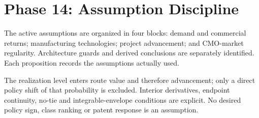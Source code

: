 \documentclass[11pt]{article}
\begin{document}
\section*{Phase 14: Assumption Discipline}
The active assumptions are organized in four blocks: demand and commercial
returns; manufacturing technologies; project advancement; and CMO-market
regularity. Architecture guards and derived conclusions are separately
identified. Each proposition records the assumptions actually used.

The realization level enters route value and therefore advancement; only a
direct policy shift of that probability is excluded. Interior derivatives,
endpoint continuity, no-tie and integrable-envelope conditions are explicit.
No desired policy sign, class ranking or patent response is an assumption.
\end{document}
